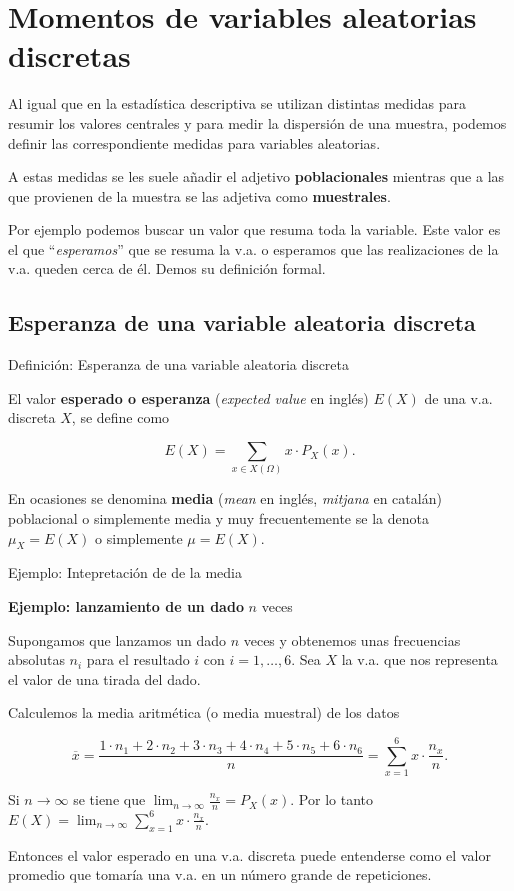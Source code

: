 \documentclass[
  letterpaper,
  DIV=11,
  numbers=noendperiod]{scrreprt}
\begin{document}
\section{Momentos de variables aleatorias
discretas}\label{momentos-de-variables-aleatorias-discretas}

Al igual que en la estadística descriptiva se utilizan distintas medidas
para resumir los valores centrales y para medir la dispersión de una
muestra, podemos definir las correspondiente medidas para variables
aleatorias.

A estas medidas se les suele añadir el adjetivo \textbf{poblacionales}
mientras que a las que provienen de la muestra se las adjetiva como
\textbf{muestrales}.

Por ejemplo podemos buscar un valor que resuma toda la variable. Este
valor es el que ``\emph{esperamos}'' que se resuma la v.a. o esperamos
que las realizaciones de la v.a. queden cerca de él. Demos su definición
formal.

\subsection{Esperanza de una variable aleatoria
discreta}\label{esperanza-de-una-variable-aleatoria-discreta}

\begin{Definicion}{Definición: Esperanza de una variable aleatoria discreta}{}

El valor \textbf{esperado o esperanza} (\emph{expected value} en inglés)
\(E(X)\) de una v.a. discreta \(X\), se define como

\[
E(X)=\sum_{x\in X(\Omega)} x\cdot P_{X}(x).
\]

En ocasiones se denomina \textbf{media} (\emph{mean} en inglés,
\emph{mitjana} en catalán) poblacional o simplemente media y muy
frecuentemente se la denota \(\mu_{X}=E(X)\) o simplemente \(\mu=E(X)\).

\end{Definicion}

\begin{Ejemplo}{Ejemplo: Intepretación de de la media}{}

\textbf{Ejemplo: lanzamiento de un dado} \(n\) veces

Supongamos que lanzamos un dado \(n\) veces y obtenemos unas frecuencias
absolutas \(n_{i}\) para el resultado \(i\) con \(i=1,\ldots,6\). Sea
\(X\) la v.a. que nos representa el valor de una tirada del dado.

Calculemos la media aritmética (o media muestral) de los datos

\[
\overline{x}=\frac{1\cdot n_1+2\cdot  n_2+3\cdot  n_3+4\cdot  n_4+5\cdot  n_5+6 \cdot 
n_6}{n}=\sum_{x=1}^6 x \cdot \frac{n_{x}}{n}.
\]

Si \(n\to \infty\) se tiene que
\(\displaystyle\lim_{n\to \infty} \frac{n_{x}}{n}=P_{X}(x).\) Por lo
tanto
\(E(X)=\displaystyle \lim_{n\to\infty}\sum_{x=1}^6x \cdot \frac{n_{x}}{n}.\)

Entonces el valor esperado en una v.a. discreta puede entenderse como el
valor promedio que tomaría una v.a. en un número grande de repeticiones.

\end{Ejemplo}
\end{document}
